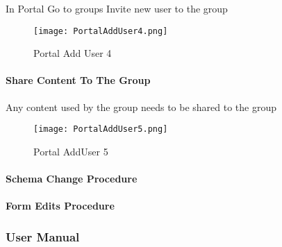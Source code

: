  In Portal {\rtArrow} Go to groups {\rtArrow} Invite new user to the group
 \vspace{.5in}

 \begin{figure}[h!]
 \centering
     \texttt{[image: PortalAddUser4.png]}
 \caption{Portal Add User 4}
 \end{figure}
 \clearpage
 \paragraph[Share Portal Content]{\Large Share Content To The Group\texorpdfstring{\\}{}}
 \vspace{.5in}

 \noindent Any content used by the group needs to be shared to the group
 \vspace{.5in}

 \begin{figure}[h!]
 \centering
     \texttt{[image: PortalAddUser5.png]}
 \caption{Portal AddUser 5}
 \end{figure}
 \clearpage

\paragraph{Schema Change Procedure}

 \clearpage
 \paragraph[Form Edits Procedure]{\Large Form Edits Procedure}
 \clearpage
 \subsubsection[User Manual]{\Large User Manual}
